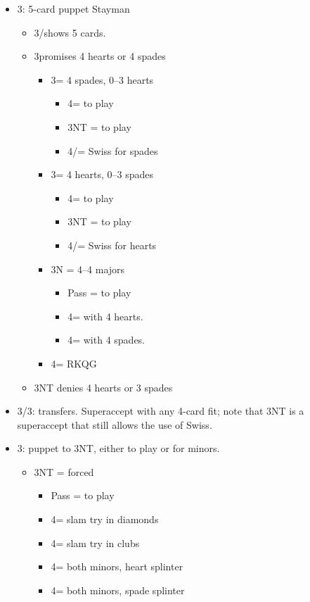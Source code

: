 \documentclass[a4paper,14pt]{extarticle}
\begin{document}
\begin{itemize}
\label{note:8}
\item 3\clubs: 5-card puppet Stayman
	\begin{itemize}
   \item 3\hearts/\spades shows 5 cards.
   \item 3\diamonds promises 4 hearts or 4 spades
		\begin{itemize}
      \item 3\hearts = 4 spades, 0--3 hearts
			\begin{itemize}
         \item 4\spades = to play
			\item 3NT = to play
			\item 4\clubs/\diamonds = Swiss  for spades
			\end{itemize}
      \item 3\spades = 4 hearts, 0--3 spades
			\begin{itemize}
         \item 4\hearts = to play
			\item 3NT = to play
			\item 4\clubs/\diamonds = Swiss  for hearts
			\end{itemize}
      \item 3N = 4--4 majors
			\begin{itemize}
			\item Pass = to play
         \item 4\hearts = with 4 hearts.
         \item 4\spades = with 4 spades.
			\end{itemize}
		\item 4\clubs = RKQG
		\end{itemize}
   \item 3NT denies 4 hearts or 3 spades
	\end{itemize}

\item 3\diamonds/3\hearts: transfers. Superaccept with any 4-card fit; note that 3NT is a
superaccept that still allows the use of Swiss.

\label{note:10}
\item 3\spades: puppet to 3NT, either to play or for minors.
	\begin{itemize}
   \item 3NT = forced
		\begin{itemize}
		\item Pass = to play
		\item 4\clubs = slam try in diamonds
		\item 4\diamonds = slam try in clubs
		\item 4\hearts = both minors, heart splinter
		\item 4\spades = both minors, spade splinter
		\end{itemize}
	\end{itemize}


\end{itemize}
\end{document}
